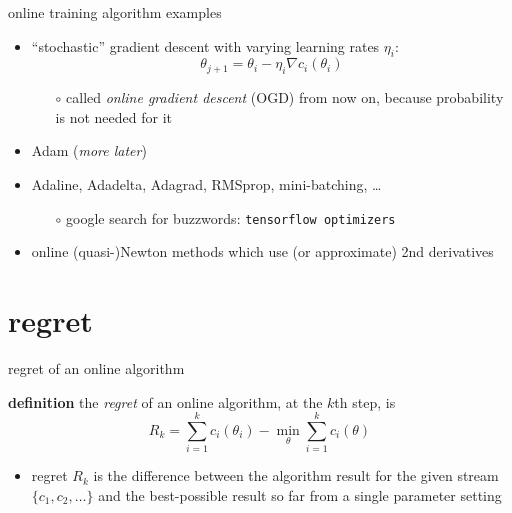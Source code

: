 \documentclass[xcolor={svgnames},
               hyperref={colorlinks,citecolor=DeepPink4,linkcolor=FireBrick,urlcolor=Maroon}]
               {beamer}
\newcommand{\grad}{\nabla}
\begin{document}
\begin{frame}{online training algorithm examples}

\begin{itemize}
\item ``stochastic'' gradient descent with varying learning rates $\eta_i$:
   $$\theta_{j+1} = \theta_i - \eta_i \grad c_i(\theta_i)$$

    \begin{itemize}
    \item[$\circ$] called \emph{online gradient descent} (OGD) from now on, because probability is not needed for it
    \end{itemize}
\item Adam (\emph{more later})
\item Adaline, Adadelta, Adagrad, RMSprop, mini-batching, \dots
    \begin{itemize}
    \item[$\circ$] google search for buzzwords: \quad \texttt{tensorflow optimizers}
    \end{itemize}
\item online (quasi-)Newton methods which use (or approximate) 2nd derivatives
\end{itemize}
\end{frame}

\section{regret}

\begin{frame}{regret of an online algorithm}

\begin{block}{\textbf{definition}}
the \emph{regret} of an online algorithm, at the $k$th step, is
    $$R_k = \sum_{i=1}^k c_i(\theta_i) - \min_\theta \sum_{i=1}^k c_i(\theta)$$
\end{block}

\begin{itemize}
\item regret $R_k$ is the difference between the algorithm result for the given stream $\{c_1,c_2,\dots\}$ and the best-possible result so far from a single parameter setting
\end{itemize}
\end{frame}
\end{document}
